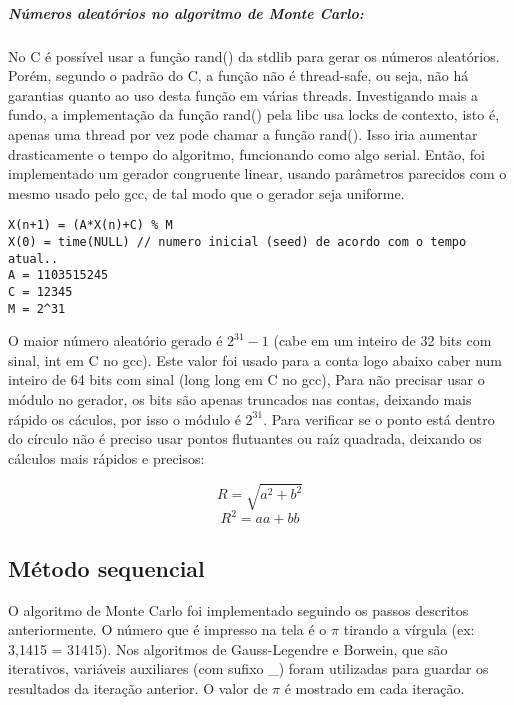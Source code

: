 \documentclass[a4paper]{article}
\begin{document}
\subparagraph{Números aleatórios no algoritmo de Monte Carlo:}
No C é possível usar a função rand() da stdlib para gerar os números aleatórios. Porém, segundo
o padrão do C, a função não é thread-safe, ou seja, não há garantias quanto ao uso desta função
em várias threads. Investigando mais a fundo, a implementação da função rand() pela libc usa
locks de contexto, isto é, apenas uma thread por vez pode chamar a função rand(). Isso iria
aumentar drasticamente o tempo do algoritmo, funcionando como algo serial. Então, foi implementado 
um gerador congruente linear, usando parâmetros parecidos com o mesmo usado pelo gcc, de tal modo 
que o gerador seja uniforme.\\

\begin{lstlisting}[caption=Algoritmo do gerador congruente linear, float=h]
X(n+1) = (A*X(n)+C) % M
X(0) = time(NULL) // numero inicial (seed) de acordo com o tempo atual..
A = 1103515245
C = 12345
M = 2^31
\end{lstlisting}

O maior número aleatório gerado é \begin{math}2^{31} - 1\end{math} (cabe em um inteiro de 32 bits com sinal, int em C no gcc). 
Este valor foi usado para a conta logo abaixo caber num inteiro de 64 bits com sinal (long long em C no gcc), 
Para não precisar usar o módulo no gerador, os bits são apenas truncados nas contas, deixando mais 
rápido os cáculos, por isso o módulo é \begin{math}2^{31}\end{math}. Para verificar se o ponto está dentro do círculo não é preciso 
usar pontos flutuantes ou raíz quadrada, deixando os cálculos mais rápidos e precisos:

\begin{displaymath}
	R = \sqrt{a^2 + b^2}
\end{displaymath}
\begin{displaymath}
	R^2 = a a + b b
\end{displaymath}

\subsection{Método sequencial}
O algoritmo de Monte Carlo foi implementado seguindo os passos descritos anteriormente. 
O número que é impresso na tela é o \begin{math}\pi\end{math} tirando a vírgula (ex: 3,1415 = 31415). 
Nos algoritmos de  Gauss-Legendre e Borwein, que são iterativos, variáveis auxiliares
(com sufixo \_) foram utilizadas para guardar os resultados da iteração anterior. O
valor de \begin{math}\pi\end{math} é mostrado em cada iteração.
\end{document}
